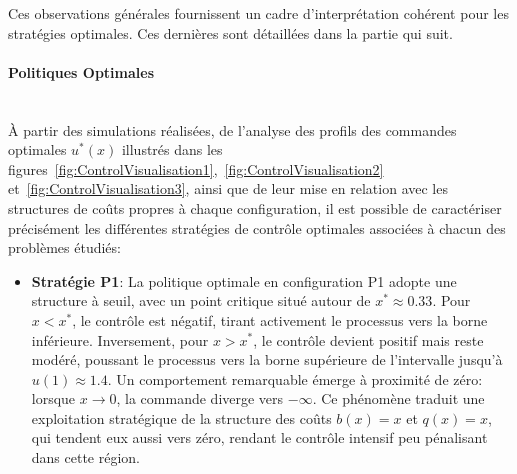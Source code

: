 Ces observations générales fournissent un cadre d'interprétation cohérent pour les stratégies optimales. Ces dernières sont détaillées dans la partie qui suit.
\paragraph{Politiques Optimales}\phantom{}\\
À partir des simulations réalisées, de l'analyse des profils des commandes optimales \( u^*(x) \) illustrés dans les figures~\ref{fig:ControlVisualisation1},~\ref{fig:ControlVisualisation2} et~\ref{fig:ControlVisualisation3}, ainsi que de leur mise en relation avec les structures de coûts propres à chaque configuration, il est possible de caractériser précisément les différentes stratégies de contrôle optimales associées à chacun des problèmes étudiés:
\begin{itemize}
    \item \textbf{Stratégie P1}: La politique optimale en configuration P1 adopte une structure à seuil, avec un point critique situé autour de \(x^* \approx 0.33\). Pour \(x < x^*\), le contrôle est négatif, tirant activement le processus vers la borne inférieure. Inversement, pour \(x > x^*\), le contrôle devient positif mais reste modéré, poussant le processus vers la borne supérieure de l'intervalle jusqu'à \(u(1)\approx1.4\). Un comportement remarquable émerge à proximité de zéro: lorsque \(x \to 0\), la commande diverge vers \(-\infty\). Ce phénomène traduit une exploitation stratégique de la structure des coûts \(b(x) = x\) et \(q(x) = x\), qui tendent eux aussi vers zéro, rendant le contrôle intensif peu pénalisant dans cette région.


\end{itemize}

